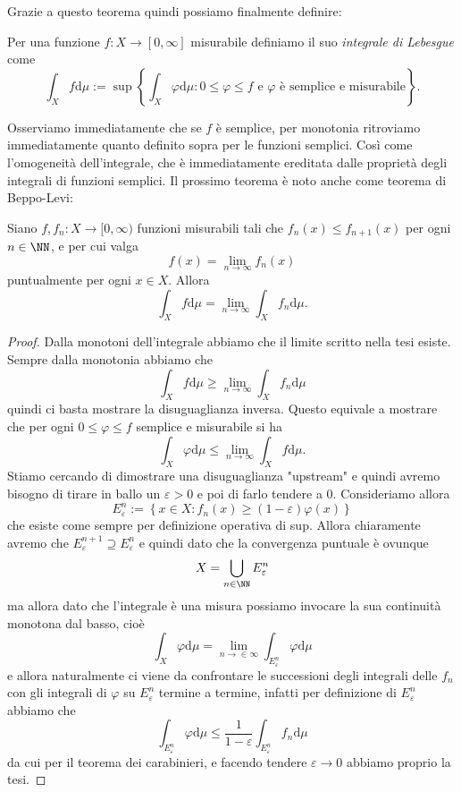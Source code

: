 \documentclass[11pt]{scrartcl}
\newcommand{\dif}{\text{d}}
\begin{document}
	Grazie a questo teorema quindi possiamo finalmente definire:
	\begin{definition}
		Per una funzione $f:X\to [0,\infty]$ misurabile definiamo il suo \textit{integrale di Lebesgue} come
		$$\int_X f\dif \mu := \sup\left\{\int_X\varphi \dif \mu : 0\le \varphi\le f \text{ e $\varphi$ è semplice e misurabile}\right\}.$$
	\end{definition}
	Osserviamo immediatamente che se $f$ è semplice, per monotonia ritroviamo immediatamente quanto definito sopra per le funzioni semplici. Così come l'omogeneità dell'integrale, che è immediatamente ereditata dalle proprietà degli integrali di funzioni semplici. Il prossimo teorema è noto anche come teorema di Beppo-Levi:
	\begin{theorem}
		Siano $f,f_n:X\to [0,\infty)$ funzioni misurabili tali che $f_n(x)\le f_{n+1}(x)$ per ogni $n\in \NN$, e per cui valga
		$$f(x)=\lim_{n\to\infty}f_n(x)$$
		puntualmente per ogni $x\in X$. Allora 
		$$\int_Xf\dif \mu = \lim_{n\to\infty}\int_X f_n\dif \mu.$$
	\end{theorem}
	\begin{proof}
		Dalla monotoni dell'integrale abbiamo che il limite scritto nella tesi esiste. Sempre dalla monotonia abbiamo che
		$$\int_Xf\dif \mu \ge \lim_{n\to\infty}\int_X f_n\dif \mu$$
		quindi ci basta mostrare la disuguaglianza inversa. Questo equivale a mostrare che per ogni $0\le \varphi\le f$ semplice e misurabile si ha
		$$\int_X\varphi \dif \mu \le \lim_{n\to\infty}\int_Xf\dif \mu.$$
		Stiamo cercando di dimostrare una disuguaglianza "upstream" e quindi avremo bisogno di tirare in ballo un $\varepsilon>0$ e poi di farlo tendere a $0$. Consideriamo allora 
		$$E_\varepsilon^n:=\left\{x\in X:f_n(x)\ge (1-\varepsilon)\varphi(x)\right\}$$
		che esiste come sempre per definizione operativa di sup. Allora chiaramente avremo che $E_\varepsilon^{n+1}\supseteq E_{\varepsilon}^n$ e quindi dato che la convergenza puntuale è ovunque 
		$$X=\bigcup_{n\in\NN}E^n_\varepsilon$$
		ma allora dato che l'integrale è una misura possiamo invocare la sua continuità monotona dal basso, cioè
		$$\int_X \varphi \dif \mu = \lim_{n\to\in\infty}\int_{E^n_\varepsilon}\varphi \dif \mu$$ 
		e allora naturalmente ci viene da confrontare le successioni degli integrali delle $f_n$ con gli integrali di $\varphi$ su $E^n_\varepsilon$ termine a termine, infatti per definizione di $E_\varepsilon^n$ abbiamo che 
		$$\int_{E^n_\varepsilon}\varphi\dif \mu\le \frac{1}{1-\varepsilon}\int_{E^n_\varepsilon}f_n\dif \mu$$
		da cui per il teorema dei carabinieri, e facendo tendere $\varepsilon\to 0$ abbiamo proprio la tesi.
	\end{proof}
\end{document}
